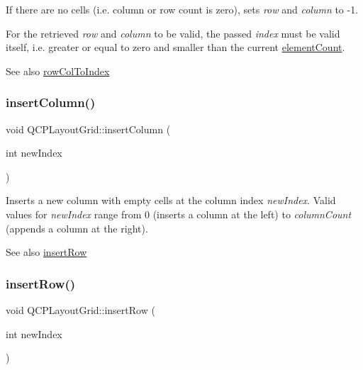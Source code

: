 If there are no cells (i.\+e. column or row count is zero), sets {\itshape row} and {\itshape column} to -\/1.

For the retrieved {\itshape row} and {\itshape column} to be valid, the passed {\itshape index} must be valid itself, i.\+e. greater or equal to zero and smaller than the current \hyperlink{classQCPLayoutGrid_a9a8942aface780a02445ebcf14c48513}{element\+Count}.

\begin{DoxySeeAlso}{See also}
\hyperlink{classQCPLayoutGrid_a682ba76f130810ffd294032a1bfbcfcb}{row\+Col\+To\+Index} 
\end{DoxySeeAlso}
\mbox{\label{classQCPLayoutGrid_a1e880a321dbe8b43b471ccd764433dc4}} 
\subsubsection{\texorpdfstring{insert\+Column()}{insertColumn()}}
{\footnotesize\ttfamily void Q\+C\+P\+Layout\+Grid\+::insert\+Column (\begin{DoxyParamCaption}\item[{int}]{new\+Index }\end{DoxyParamCaption})}

Inserts a new column with empty cells at the column index {\itshape new\+Index}. Valid values for {\itshape new\+Index} range from 0 (inserts a column at the left) to {\itshape column\+Count} (appends a column at the right).

\begin{DoxySeeAlso}{See also}
\hyperlink{classQCPLayoutGrid_a48af3dd7c3a653d9c3d7dd99bd02e838}{insert\+Row} 
\end{DoxySeeAlso}
\mbox{\label{classQCPLayoutGrid_a48af3dd7c3a653d9c3d7dd99bd02e838}} 
\subsubsection{\texorpdfstring{insert\+Row()}{insertRow()}}
{\footnotesize\ttfamily void Q\+C\+P\+Layout\+Grid\+::insert\+Row (\begin{DoxyParamCaption}\item[{int}]{new\+Index }\end{DoxyParamCaption})}

